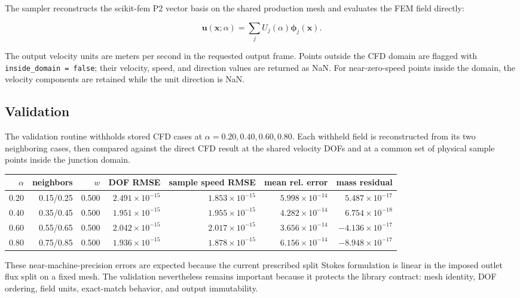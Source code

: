 The sampler reconstructs the scikit-fem P2 vector basis on the shared
production mesh and evaluates the FEM field directly:

\[
  \mathbf{u}(\mathbf{x};\alpha)
  =
  \sum_j U_j(\alpha)\boldsymbol{\phi}_j(\mathbf{x}).
\]

The output velocity units are meters per second in the requested output frame.
Points outside the CFD domain are flagged with \texttt{inside\_domain = false};
their velocity, speed, and direction values are returned as NaN. For
near-zero-speed points inside the domain, the velocity components are retained
while the unit direction is NaN.

\subsection{Validation}

The validation routine withholds stored CFD cases at
\(\alpha=0.20,0.40,0.60,0.80\). Each withheld field is reconstructed from its
two neighboring cases, then compared against the direct CFD result at the
shared velocity DOFs and at a common set of physical sample points inside the
junction domain.

\begin{center}
\begin{tabular}{rrrrrrr}
\toprule
\(\alpha\) & neighbors & \(w\) & DOF RMSE & sample speed RMSE & mean rel. error & mass residual \\
\midrule
0.20 & 0.15/0.25 & 0.500 & \(2.491{\times}10^{-15}\) & \(1.853{\times}10^{-15}\) & \(5.998{\times}10^{-14}\) & \(5.487{\times}10^{-17}\) \\
0.40 & 0.35/0.45 & 0.500 & \(1.951{\times}10^{-15}\) & \(1.955{\times}10^{-15}\) & \(4.282{\times}10^{-14}\) & \(6.754{\times}10^{-18}\) \\
0.60 & 0.55/0.65 & 0.500 & \(2.042{\times}10^{-15}\) & \(2.017{\times}10^{-15}\) & \(3.656{\times}10^{-14}\) & \(-4.136{\times}10^{-17}\) \\
0.80 & 0.75/0.85 & 0.500 & \(1.936{\times}10^{-15}\) & \(1.878{\times}10^{-15}\) & \(6.156{\times}10^{-14}\) & \(-8.948{\times}10^{-17}\) \\
\bottomrule
\end{tabular}
\end{center}

These near-machine-precision errors are expected because the current prescribed
split Stokes formulation is linear in the imposed outlet flux split on a fixed
mesh. The validation nevertheless remains important because it protects the
library contract: mesh identity, DOF ordering, field units, exact-match
behavior, and output immutability.

